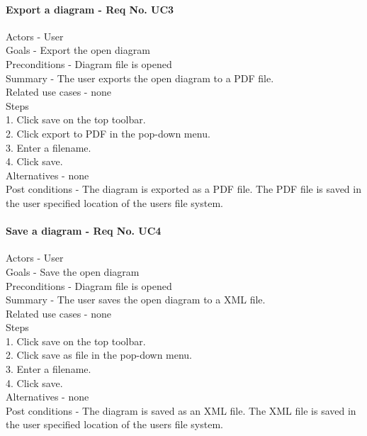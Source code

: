\documentclass[twoside,letterpaper]{article}
\begin{document}
{\paragraph{Export a diagram - Req No. UC3\newline}
Actors - User\\
Goals - Export the open diagram\\
Preconditions - Diagram file is opened\\
Summary - The user exports the open diagram to a PDF file.\\
Related use cases - none\\
Steps\\
1. Click save on the top toolbar. \\
2. Click export to PDF in the pop-down menu.\\
3. Enter a filename.\\
4. Click save.\\
Alternatives - none\\
Post conditions - The diagram is exported as a PDF file. The PDF file is saved in the user specified location of the users file system.\\

\paragraph{Save a diagram - Req No. UC4\newline}
Actors - User\\
Goals - Save the open diagram\\
Preconditions - Diagram file is opened\\
Summary - The user saves the open diagram to a XML file.\\
Related use cases - none\\
Steps\\
1. Click save on the top toolbar.\\
2. Click save as file in the pop-down menu.\\
3. Enter a filename.\\
4. Click save.\\
Alternatives - none\\
Post conditions - The diagram is saved as an XML file. The XML file is saved in the user specified location of the users file system.\\

}
\end{document}
